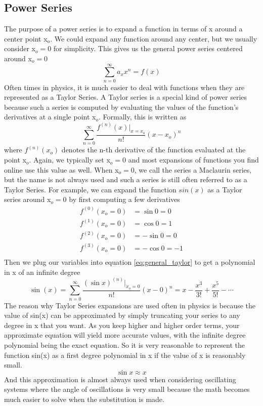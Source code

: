 \documentclass{article}
\newcommand{\be}{\begin{equation}}
\newcommand{\ee}{\end{equation}}
\newcommand{\sumzero}{\sum_{n=0}^\infty}
\begin{document}
\subsection*{Power Series}
The purpose of a power series is to expand a function in terms of x around a center point x$_o$.
We could expand any function around any center, but we usually consider x$_o = 0$ for simplicity.
This gives us the general power series centered around x$_o = 0$
\be
\sumzero a_x x^n = f(x)
\ee
Often times in physics, it is much easier to deal with functions when they are represented as a Taylor Series.
A Taylor series is a special kind of power series because such a series is computed by evaluating the values of the function's derivatives at a single point x$_o$.
Formally, this is written as
\be \label{eq:general_taylor}
\sumzero \frac{f^{(n)} (x) \Big|_{x=x_o}}{n!} (x - x_o)^n
\ee
where $f^{(n)} (x_o)$ denotes the n-th derivative of the function evaluated at the point x$_o$.
Again, we typically set x$_o = 0$ and most expansions of functions you find online use this value as well.
When x$_o = 0$, we call the series a Maclaurin series, but the name is not always used and such a series is still often referred to as a Taylor Series.
For example, we can expand the function $sin(x)$ as a Taylor series around x$_o = 0$ by first computing a few derivatives
\be
\begin{split}
f^{(0)} (x_o = 0) &= \sin{0} = 0\\
f^{(1)} (x_o = 0) &= \cos{0} = 1\\
f^{(2)} (x_o = 0) &= - \sin{0} = 0\\
f^{(3)} (x_o = 0) &= - \cos{0} = -1\\
\end{split}
\ee
Then we plug our variables into equation \ref{eq:general_taylor} to get a polynomial in x of an infinite degree
\be
\sin(x) = \sumzero \frac{(\sin{x})^{(n)} \Big|_{x_o = 0}}{n!} (x-0)^n = x - \frac{x^3}{3!} + \frac{x^5}{5!} - \cdots
\ee
The reason why Taylor Series expansions are used often in physics is because the value of sin(x) can be approximated by simply truncating your series to any degree in x that you want.
As you keep higher and higher order terms, your approximate equation will yield more accurate values, with the infinite degree polynomial being the exact equation.
So it is very reasonable to represent the function sin(x) as a first degree polynomial in x if the value of x is reasonably small.
\be
\sin{x} \approx x
\ee
And this approximation is almost always used when considering oscillating systems where the angle of oscillations is very small because the math becomes much easier to solve when the substitution is made.
\end{document}
